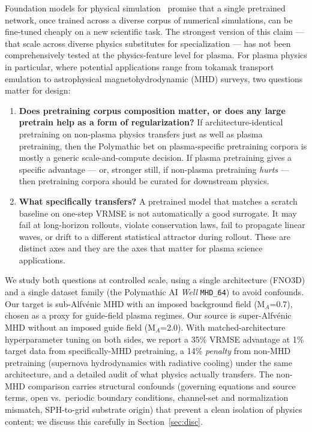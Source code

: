 \documentclass{article}
\begin{document}
Foundation models for physical simulation~\cite{mccabe2025walrus,herde2024poseidon,mccabe2024multiple} promise that a single pretrained network, once trained across a diverse corpus of numerical simulations, can be fine-tuned cheaply on a new scientific task. The strongest version of this claim --- that scale across diverse physics substitutes for specialization --- has not been comprehensively tested at the physics-feature level for plasma. For plasma physics in particular, where potential applications range from tokamak transport emulation to astrophysical magnetohydrodynamic (MHD) surveys, two questions matter for design:

\begin{enumerate}
\item \textbf{Does pretraining corpus composition matter, or does any large pretrain help as a form of regularization?} If architecture-identical pretraining on non-plasma physics transfers just as well as plasma pretraining, then the Polymathic bet on plasma-specific pretraining corpora is mostly a generic scale-and-compute decision. If plasma pretraining gives a specific advantage --- or, stronger still, if non-plasma pretraining \emph{hurts} --- then pretraining corpora should be curated for downstream physics.

\item \textbf{What specifically transfers?} A pretrained model that matches a scratch baseline on one-step VRMSE is not automatically a good surrogate. It may fail at long-horizon rollouts, violate conservation laws, fail to propagate linear waves, or drift to a different statistical attractor during rollout. These are distinct axes and they are the axes that matter for plasma science applications.
\end{enumerate}

We study both questions at controlled scale, using a single architecture (FNO3D) and a single dataset family (the Polymathic AI \emph{Well} \texttt{MHD\_64}) to avoid confounds. Our target is sub-Alfv\'enic MHD with an imposed background field (M$_A$=0.7), chosen as a proxy for guide-field plasma regimes. Our source is super-Alfv\'enic MHD without an imposed guide field (M$_A$=2.0). With matched-architecture hyperparameter tuning on both sides, we report a 35\% VRMSE advantage at 1\% target data from specifically-MHD pretraining, a 14\% \emph{penalty} from non-MHD pretraining (supernova hydrodynamics with radiative cooling) under the same architecture, and a detailed audit of what physics actually transfers. The non-MHD comparison carries structural confounds (governing equations and source terms, open vs.\ periodic boundary conditions, channel-set and normalization mismatch, SPH-to-grid substrate origin) that prevent a clean isolation of physics content; we discuss this carefully in Section~\ref{sec:disc}.
\end{document}
